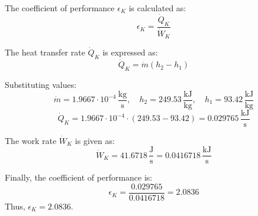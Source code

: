 The coefficient of performance \( \epsilon_K \) is calculated as:  
\[
\epsilon_K = \frac{\dot{Q}_K}{\dot{W}_K}
\]  

The heat transfer rate \( \dot{Q}_K \) is expressed as:  
\[
\dot{Q}_K = \dot{m}(h_2 - h_1)
\]  

Substituting values:  
\[
\dot{m} = 1.9667 \cdot 10^{-4} \, \frac{\text{kg}}{\text{s}}, \quad h_2 = 249.53 \, \frac{\text{kJ}}{\text{kg}}, \quad h_1 = 93.42 \, \frac{\text{kJ}}{\text{kg}}
\]  
\[
\dot{Q}_K = 1.9667 \cdot 10^{-4} \cdot (249.53 - 93.42) = 0.029765 \, \frac{\text{kJ}}{\text{s}}
\]  

The work rate \( \dot{W}_K \) is given as:  
\[
\dot{W}_K = 41.6718 \, \frac{\text{J}}{\text{s}} = 0.0416718 \, \frac{\text{kJ}}{\text{s}}
\]  

Finally, the coefficient of performance is:  
\[
\epsilon_K = \frac{0.029765}{0.0416718} = 2.0836
\]  
Thus, \( \epsilon_K = 2.0836 \).